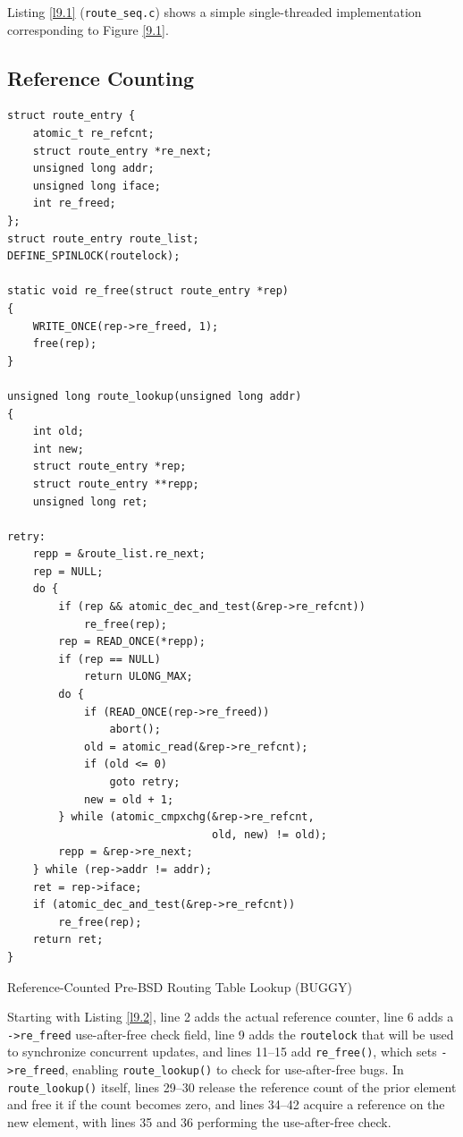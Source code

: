 \documentclass[11pt]{article}
\begin{document}
Listing \ref{l9.1} (\texttt{route\_seq.c}) shows a simple single-threaded implementation corresponding to Figure \ref{9.1}.
\subsection{Reference Counting}
\label{sec:org8630a72}
\begin{listing}[htbp]
\begin{verbatim}
struct route_entry {
    atomic_t re_refcnt;
    struct route_entry *re_next;
    unsigned long addr;
    unsigned long iface;
    int re_freed;
};
struct route_entry route_list;
DEFINE_SPINLOCK(routelock);

static void re_free(struct route_entry *rep)
{
    WRITE_ONCE(rep->re_freed, 1);
    free(rep);
}

unsigned long route_lookup(unsigned long addr)
{
    int old;
    int new;
    struct route_entry *rep;
    struct route_entry **repp;
    unsigned long ret;

retry:
    repp = &route_list.re_next;
    rep = NULL;
    do {
        if (rep && atomic_dec_and_test(&rep->re_refcnt))
            re_free(rep);
        rep = READ_ONCE(*repp);
        if (rep == NULL)
            return ULONG_MAX;
        do {
            if (READ_ONCE(rep->re_freed))
                abort();
            old = atomic_read(&rep->re_refcnt);
            if (old <= 0)
                goto retry;
            new = old + 1;
        } while (atomic_cmpxchg(&rep->re_refcnt,
                                old, new) != old);
        repp = &rep->re_next;
    } while (rep->addr != addr);
    ret = rep->iface;
    if (atomic_dec_and_test(&rep->re_refcnt))
        re_free(rep);
    return ret;
}
\end{verbatim}
\caption{\label{l9.2}Reference-Counted Pre-BSD Routing Table Lookup (BUGGY)}
\end{listing}

Starting with Listing \ref{l9.2}, line 2 adds the actual reference counter, line 6 adds a \texttt{->re\_freed}
use-after-free check field, line 9 adds the \texttt{routelock} that will be used to synchronize concurrent
updates, and lines 11–15 add \texttt{re\_free()}, which sets \texttt{->re\_freed}, enabling \texttt{route\_lookup()} to check for
use-after-free bugs. In \texttt{route\_lookup()} itself, lines 29–30 release the reference count of the prior
element and free it if the count becomes zero, and lines 34–42 acquire a reference on the new element,
with lines 35 and 36 performing the use-after-free check.
\end{document}
